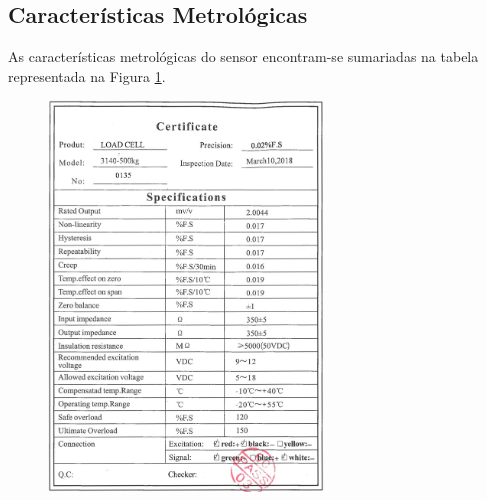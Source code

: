 \documentclass{article}
\begin{document}
\subsection{Características Metrológicas}

As características metrológicas do sensor encontram-se sumariadas na tabela representada na Figura \ref{fig:fig10}.

\begin{figure}[htb!]
\centering
\includegraphics[width=0.65\textwidth]{Figuras/Fig10.png}
\label{fig:fig10}
\end{figure}
\end{document}
